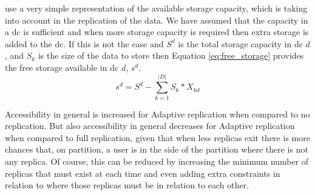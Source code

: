 \documentclass{acm_proc_article-sp}
\begin{document}
\citet{Paiva2013a} use a very simple representation of the available storage capacity, which is taking into account in the replication of the data. We have assumed that the capacity in a \gls{dc} is sufficient and when more storage capacity is required then extra storage is added to the \gls{dc}. If this is not the case and $S^{d}$ is the total storage capacity in \gls{dc} $d$, and $S_{k}$ is the size of the data to store then Equation \ref{eq:free_storage} provides the free storage available in \gls{dc} $d$, $s^{d}$.
\begin{equation} \label{eq:free_storage}
	s^{d} = S^{d} - \sum^{|D|}_{k = 1} S_{k} * X_{kd}
\end{equation}

Accessibility in general is increased for Adaptive replication when compared to no replication. But also accessibility in general decreases for Adaptive replication when compared to full replication, given that when less replicas exit there is more chances that, on partition, a user is in the side of the partition where there is not any replica. Of course, this can be reduced by increasing the minimum number of replicas that must exist at each time and even adding extra constraints in relation to where those replicas must be in relation to each other.
\end{document}
